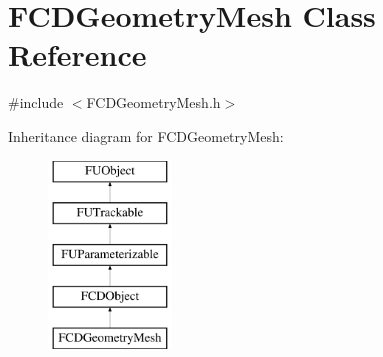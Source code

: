 \hypertarget{classFCDGeometryMesh}{
\section{FCDGeometryMesh Class Reference}
\label{classFCDGeometryMesh}
}


{\ttfamily \#include $<$FCDGeometryMesh.h$>$}

Inheritance diagram for FCDGeometryMesh:\begin{figure}[H]
\begin{center}
\leavevmode
\includegraphics[height=5.000000cm]{classFCDGeometryMesh}
\end{center}
\end{figure}
